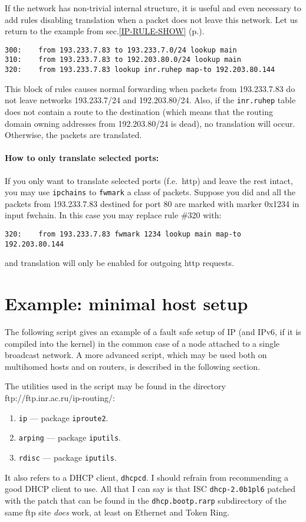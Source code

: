 If the network has non-trivial internal structure, it is
useful and even necessary to add rules disabling translation
when a packet does not leave this network. Let us return to the
example from sec.\ref{IP-RULE-SHOW} (p.\pageref{IP-RULE-SHOW}).
\begin{verbatim}
300:	from 193.233.7.83 to 193.233.7.0/24 lookup main
310:	from 193.233.7.83 to 192.203.80.0/24 lookup main
320:	from 193.233.7.83 lookup inr.ruhep map-to 192.203.80.144
\end{verbatim}
This block of rules causes normal forwarding when
packets from 193.233.7.83 do not leave networks 193.233.7/24
and 192.203.80/24. Also, if the \verb|inr.ruhep| table does not
contain a route to the destination (which means that the routing
domain owning addresses from 192.203.80/24 is dead), no translation
will occur. Otherwise, the packets are translated.

\paragraph{How to only translate selected ports:}
If you only want to translate selected ports (f.e.\ http)
and leave the rest intact, you may use \verb|ipchains|
to \verb|fwmark| a class of packets.
Suppose you did and all the packets from 193.233.7.83
destined for port 80 are marked with marker 0x1234 in input fwchain.
In this case you may replace rule \#320 with:
\begin{verbatim}
320:	from 193.233.7.83 fwmark 1234 lookup main map-to 192.203.80.144
\end{verbatim}
and translation will only be enabled for outgoing http requests.

\section{Example: minimal host setup}
\label{EXAMPLE-SETUP}

The following script gives an example of a fault safe
setup of IP (and IPv6, if it is compiled into the kernel)
in the common case of a node attached to a single broadcast
network. A more advanced script, which may be used both on multihomed
hosts and on routers, is described in the following
section.

The utilities used in the script may be found in the
directory ftp://ftp.inr.ac.ru/ip-routing/:
\begin{enumerate}
\item \verb|ip| --- package \verb|iproute2|.
\item \verb|arping| --- package \verb|iputils|.
\item \verb|rdisc| --- package \verb|iputils|.
\end{enumerate}
\begin{NB}
It also refers to a DHCP client, \verb|dhcpcd|. I should refrain from
recommending a good DHCP client to use. All that I can
say is that ISC \verb|dhcp-2.0b1pl6| patched with the patch that
can be found in the \verb|dhcp.bootp.rarp| subdirectory of
the same ftp site {\em does\/} work,
at least on Ethernet and Token Ring.
\end{NB}

